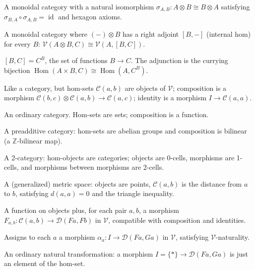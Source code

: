 \begin{exercisesbox}
\begin{qa}
       {A monoidal category with a natural isomorphism $\sigma_{A,B} : A\otimes B \cong B\otimes A$
        satisfying $\sigma_{B,A} \circ \sigma_{A,B} = \operatorname{id}$ and hexagon axioms.}

       {A monoidal category where $(-)\otimes B$ has a right adjoint $[B,-]$ (internal hom)
        for every $B$: $\mathcal{V}(A\otimes B, C) \cong \mathcal{V}(A, [B,C])$.}

       {$[B, C] = C^B$, the set of functions $B \to C$. The adjunction is the
        currying bijection $\operatorname{Hom}(A\times B, C) \cong \operatorname{Hom}(A, C^B)$.}

       {Like a category, but hom-sets $\mathcal{C}(a,b)$ are objects of $\mathcal{V}$;
        composition is a morphism $\mathcal{C}(b,c)\otimes\mathcal{C}(a,b) \to \mathcal{C}(a,c)$;
        identity is a morphism $I \to \mathcal{C}(a,a)$.}

       {An ordinary category. Hom-sets are sets; composition is a function.}

       {A preadditive category: hom-sets are abelian groups and composition
        is bilinear (a $\mathbb{Z}$-bilinear map).}

       {A 2-category: hom-objects are categories; objects are 0-cells,
        morphisms are 1-cells, and morphisms between morphisms are 2-cells.}

       {A (generalized) metric space: objects are points, $\mathcal{C}(a,b)$ is
        the distance from $a$ to $b$, satisfying $d(a,a) = 0$ and the triangle
        inequality.}

       {A function on objects plus, for each pair $a,b$, a morphism
        $F_{a,b} : \mathcal{C}(a,b) \to \mathcal{D}(Fa,Fb)$ in $\mathcal{V}$,
        compatible with composition and identities.}

       {Assigns to each $a$ a morphism $\alpha_a : I \to \mathcal{D}(Fa, Ga)$
        in $\mathcal{V}$, satisfying $\mathcal{V}$-naturality.}

       {An ordinary natural transformation: a morphism $I = \{*\} \to \mathcal{D}(Fa,Ga)$
        is just an element of the hom-set.}


\end{qa}
\end{exercisesbox}
